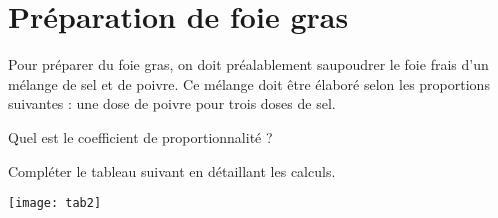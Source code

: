 \section{Préparation de foie gras}

Pour préparer du foie gras, on doit préalablement saupoudrer le foie frais d'un mélange de sel et de poivre. Ce mélange doit être élaboré selon les proportions suivantes : une dose de poivre pour trois doses de sel.

\begin{questions}
	\question Quel est le coefficient de proportionnalité ?
	
	\question Compléter le tableau suivant en détaillant les calculs.
	
	\begin{center}
		\texttt{[image: tab2]}
	\end{center}
\end{questions}
